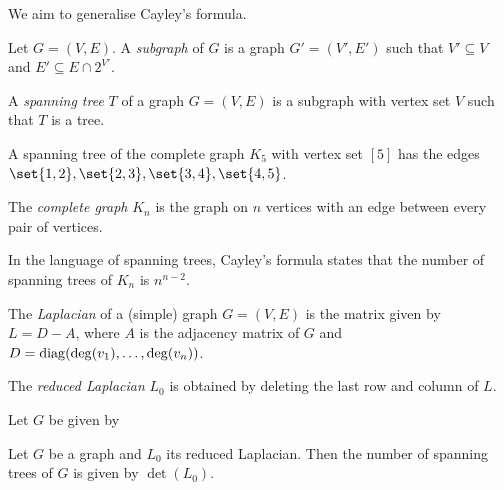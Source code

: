 We aim to generalise Cayley's formula.
\begin{definition}[Subgraph] \label{def:graph:subgraph}
    Let $G = (V, E)$.
    A \emph{subgraph} of $G$ is a graph $G' = (V', E')$ such that
    $V' \subseteq V$ and $E' \subseteq E \cap 2^{V'}$.
\end{definition}

\begin{definition} \label{def:graph:spanning_tree}
    A \emph{spanning tree} $T$ of a graph $G = (V, E)$ is a subgraph with
    vertex set $V$ such that $T$ is a tree.
\end{definition}
\begin{example}
    A spanning tree of the complete graph $K_5$ with vertex set $[5]$ has
    the edges $\set{1, 2}, \set{2, 3}, \set{3, 4}, \set{4, 5}$.
\end{example}

\begin{definition} \label{def:graph:complete}
    The \emph{complete graph} $K_n$ is the graph on $n$ vertices with
    an edge between every pair of vertices.
\end{definition}
In the language of spanning trees, Cayley's formula states that the number
of spanning trees of $K_n$ is $n^{n-2}$.

\begin{definition*}[Laplacian] \label{def:graph:laplacian}
    The \emph{Laplacian} of a (simple) graph $G = (V, E)$ is the matrix
    given by $L = D - A$, where $A$ is the adjacency matrix of $G$ and
    $D = \operatorname{diag}(\operatorname{deg}(v_1), \dots, \operatorname{deg}(v_n))$.

    The \emph{reduced Laplacian} $L_0$ is obtained by deleting the last row
    and column of $L$.
\end{definition*}

\begin{example}
    Let $G$ be given by
    \begin{center}
    \end{center}
\end{example}

\begin{theorem*} \label{thm:graph:kirchoff}
    Let $G$ be a graph and $L_0$ its reduced Laplacian.
    Then the number of spanning trees of $G$ is given by $\det(L_0)$.
\end{theorem*}

